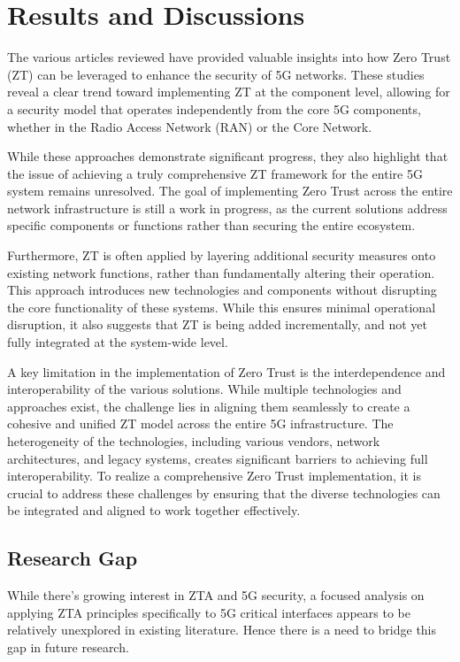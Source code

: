 \documentclass{report}
\begin{document}
\section{Results and Discussions}
    The various articles reviewed have provided valuable insights into how Zero Trust (ZT) can be leveraged to enhance the security of 5G networks. These studies reveal a clear trend toward implementing ZT at the component level, allowing for a security model that operates independently from the core 5G components, whether in the Radio Access Network (RAN) or the Core Network.

    While these approaches demonstrate significant progress, they also highlight that the issue of achieving a truly comprehensive ZT framework for the entire 5G system remains unresolved. The goal of implementing Zero Trust across the entire network infrastructure is still a work in progress, as the current solutions address specific components or functions rather than securing the entire ecosystem.

    Furthermore, ZT is often applied by layering additional security measures onto existing network functions, rather than fundamentally altering their operation. This approach introduces new technologies and components without disrupting the core functionality of these systems. While this ensures minimal operational disruption, it also suggests that ZT is being added incrementally, and not yet fully integrated at the system-wide level.

    A key limitation in the implementation of Zero Trust is the interdependence and interoperability of the various solutions. While multiple technologies and approaches exist, the challenge lies in aligning them seamlessly to create a cohesive and unified ZT model across the entire 5G infrastructure. The heterogeneity of the technologies, including various vendors, network architectures, and legacy systems, creates significant barriers to achieving full interoperability. To realize a comprehensive Zero Trust implementation, it is crucial to address these challenges by ensuring that the diverse technologies can be integrated and aligned to work together effectively.

\subsection{Research Gap}
    While there's growing interest in ZTA and 5G security, a focused analysis on applying ZTA principles specifically to 5G critical interfaces appears to be relatively unexplored in existing literature. Hence there is a need to bridge this gap in future research.
\end{document}
